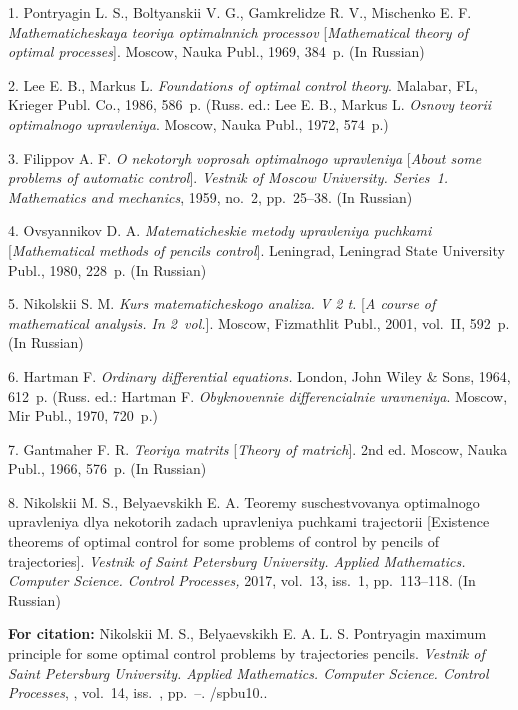 

{\footnotesize

\vskip 4mm


\vskip 4mm



1. Pontryagin L. S., Boltyanskii V. G., Gamkrelidze R. V.,
Mischenko E. F.  \textit{Mathematicheskaya teoriya optimalnnich
processov }[\textit{Mathematical theory of optimal processes}].
Moscow, Nauka Publ., 1969, 384~p. (In Russian)

2. Lee E. B., Markus L.  \textit{Foundations of optimal control
theory}. Malabar, FL, Krieger Publ. Co., 1986, 586~p. (Russ. ed.:
Lee E. B., Markus L. \textit{Osnovy teorii optimalnogo
upravleniya}. Moscow, Nauka Publ., 1972, 574~p.)

3. Filippov A. F. \textit{O nekotoryh voprosah optimalnogo
upravleniya} [\textit{About some problems of automatic control}].
\textit{Vestnik of Moscow University. Series~1. Mathematics and
mechanics}, 1959, no.~2, pp.~25--38. (In Russian)


4. Ovsyannikov D. A.  \textit{Matematicheskie metody upravleniya
puchkami} [\textit{Mathematical methods of pencils control}].
Leningrad, Leningrad State University Publ., 1980, 228~p. (In
Russian)


5. Nikolskii S. M. \textit { Kurs matematicheskogo analiza. V 2
t.} [\textit{A course of mathematical analysis. In 2~vol.}].
Moscow, Fizmathlit Publ., 2001, vol.~II, 592~p. (In Russian)

6. Hartman F.  \textit{Ordinary differential equations.} London,
John Wiley \& Sons, 1964, 612~p. (Russ. ed.: Hartman F.
\textit{Obyknovennie differencialnie uravneniya}. Moscow, Mir
Publ., 1970, 720~p.)

7. Gantmaher F. R.  \textit{Teoriya matrits} [\textit{Theory of
matrich}]. 2nd ed. Moscow, Nauka Publ., 1966, 576~p. (In Russian)

8. Nikolskii M. S., Belyaevskikh E. A.  Teoremy suschestvovanya
optimalnogo upravleniya dlya nekotorih zadach upravleniya puchkami
trajectorii [Existence theorems of optimal control for some
problems of control by pencils of trajectories]. \textit{Vestnik
of Saint Petersburg University. Applied Mathematics. Computer
Science. Control Processes,} 2017, vol.~13, iss.~1, pp.~113--118.
(In Russian)



\vskip 2mm

{\bf For citation:}   Nikolskii M. S., Belyaevskikh E. A. L. S.
Pontryagin maximum principle for some optimal control problems by
trajectories pencils. {\it Vestnik of Saint Petersburg University.
Applied Mathematics. Computer Science. Control Processes},
\issueyear, vol.~14, iss.~\issuenum,
pp.~\pageref{p7}--\pageref{p7e}.
\doivyp/spbu10.\issueyear.


}
